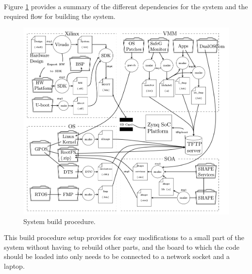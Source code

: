 Figure \ref{fig:system_build} provides a summary of the different dependencies for the system and the required flow for building the system.


\begin{figure}[H]
\centering
\includegraphics[width=\textwidth]{./img/literature_build.png}
\caption{System build procedure.\cite{zaki2016}}\label{fig:system_build}
\end{figure}


This build procedure setup provides for easy modifications to a small part of the system without having to rebuild other parts, and the board to which the code should be loaded into only needs to be connected to a network socket and a laptop.
